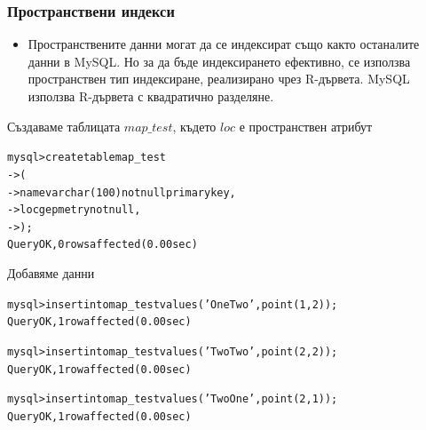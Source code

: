 \documentclass{beamer}
\begin{document}
\begin{frame}
 \frametitle{Пространствени индекси}
\begin{itemize}
\item Пространствените данни могат да се индексират също както останалите данни в MySQL. Но за да бъде 
индексирането ефективно, се използва пространствен тип индексиране, реализирано чрез R-дървета. 
MySQL използва \alert{R-дървета с квадратично разделяне}.
\end{itemize}

\end{frame}


\begin{frame}[fragile]
\begin{beamerboxesrounded}{Създаваме таблицата $map\_test$, където $loc$ е пространствен атрибут}
\begin{alltt}
mysql> create table map_test
    -> (
    ->   name varchar(100) not null primary key,
    ->   \alert{loc  gepmetry not null},
    -> );
Query OK, 0 rows affected (0.00 sec)
\end{alltt}
\end{beamerboxesrounded}

\begin{beamerboxesrounded}{Добавяме данни}
\begin{alltt}
mysql> insert into map_test values ('One Two', point(1,2));
Query OK, 1 row affected (0.00 sec)

mysql> insert into map_test values ('Two Two', point(2,2));
Query OK, 1 row affected (0.00 sec)

mysql> insert into map_test values ('Two One', point(2,1));
Query OK, 1 row affected (0.00 sec)
\end{alltt}
\end{beamerboxesrounded}
\end{frame}
\end{document}
